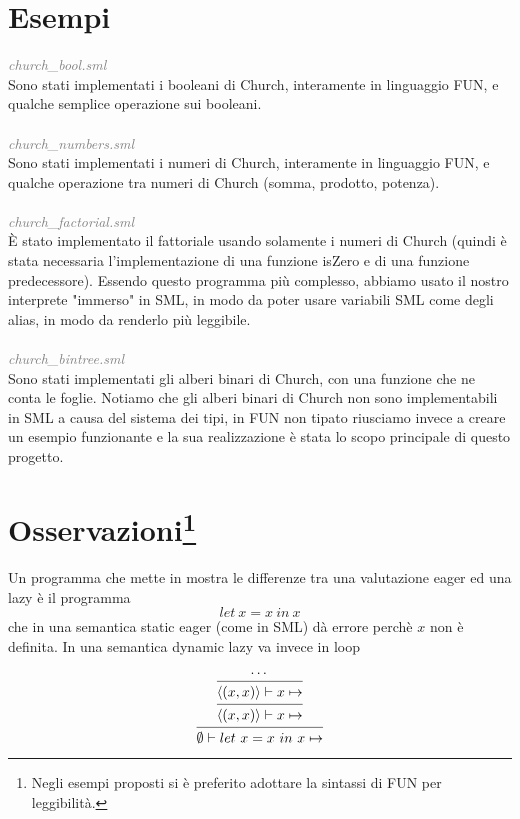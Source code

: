 \documentclass[a4paper]{article}
\begin{document}
	\section{Esempi}
	\textit{\textcolor{gray}{church\_bool.sml}} \\
	Sono stati implementati i booleani di Church, interamente in linguaggio FUN, e qualche semplice operazione sui booleani.\\ \\
	\textit{\textcolor{gray}{church\_numbers.sml}} \\
	Sono stati implementati i numeri di Church, interamente in linguaggio FUN, e qualche operazione tra numeri di Church (somma, prodotto, potenza).\\ \\
	\textit{\textcolor{gray}{church\_factorial.sml}} \\
	È stato implementato il fattoriale usando solamente i numeri di Church (quindi è stata necessaria l'implementazione di una funzione isZero e di una funzione predecessore). Essendo questo programma più complesso, abbiamo usato il nostro interprete "immerso" in SML, in modo da poter usare variabili SML come degli alias, in modo da renderlo più leggibile. \\ \\
	\textit{\textcolor{gray}{church\_bintree.sml}} \\
	Sono stati implementati gli alberi binari di Church, con una funzione che ne conta le foglie. Notiamo che gli alberi binari di Church non sono implementabili in SML a causa del sistema dei tipi, in FUN non tipato riusciamo invece a creare un esempio funzionante e la sua realizzazione è stata lo scopo principale di questo progetto.

	\section[Osservazioni]{Osservazioni\footnote{Negli esempi proposti si è preferito adottare la sintassi di FUN per leggibilità.}}
	Un programma che mette in mostra le differenze tra una valutazione eager ed una lazy è il programma 
	\[ let \ x = x \ in \ x \]
	che in una semantica static eager (come in SML) dà errore perchè $x$ non è definita. In una semantica dynamic lazy va invece in loop

	\begin{figure}[ht]
	\[
		\begin{prooftree}
			\hypo{\cdots}
			\infer1[]{\langle (x,x) \rangle \vdash x \mapsto }
			\infer1[]{\langle (x,x) \rangle \vdash x \mapsto }
			\infer1[]{\emptyset \vdash let \ x=x \ in \ x \mapsto }
		\end{prooftree}
	\]
	\end{figure}
\end{document}
